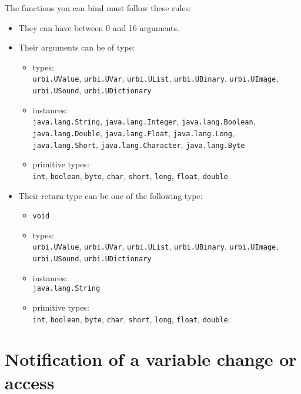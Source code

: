 The functions you can bind must follow these rules:
\begin{itemize}
\item They can have between 0 and 16 arguments.
\item Their arguments can be of type:
  \begin{itemize}
  \item \urbi types:\\
    \lstinline{urbi.UValue}, \lstinline{urbi.UVar}, \lstinline{urbi.UList},
    \lstinline{urbi.UBinary}, \lstinline{urbi.UImage},
    \lstinline{urbi.USound}, \lstinline{urbi.UDictionary}
  \item \Java instances:\\
    \lstinline{java.lang.String}, \lstinline{java.lang.Integer},
    \lstinline{java.lang.Boolean}, \lstinline{java.lang.Double},
    \lstinline{java.lang.Float}, \lstinline{java.lang.Long},
    \lstinline{java.lang.Short}, \lstinline{java.lang.Character},
    \lstinline{java.lang.Byte}
  \item \Java primitive types:\\
    \lstinline{int}, \lstinline{boolean}, \lstinline{byte},
    \lstinline{char}, \lstinline{short}, \lstinline{long},
    \lstinline{float}, \lstinline{double}.
  \end{itemize}
\item Their return type can be one of the following type:
  \begin{itemize}
  \item \lstinline{void}
  \item \urbi types:\\
    \lstinline{urbi.UValue}, \lstinline{urbi.UVar}, \lstinline{urbi.UList},
    \lstinline{urbi.UBinary}, \lstinline{urbi.UImage},
    \lstinline{urbi.USound}, \lstinline{urbi.UDictionary}
  \item \Java instances:\\
    \lstinline{java.lang.String}
  \item \Java primitive types:\\
    \lstinline{int}, \lstinline{boolean}, \lstinline{byte},
    \lstinline{char}, \lstinline{short}, \lstinline{long},
    \lstinline{float}, \lstinline{double}.
  \end{itemize}
\end{itemize}


\section{Notification of a variable change or access}
\label{sec:uob:apijava:uvar-notify}

